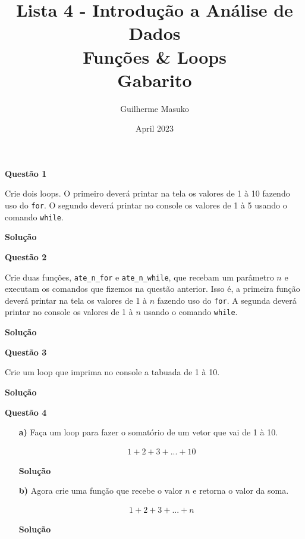 \documentclass[12pt, a4paper]{article}
\title{Lista 4 - Introdução a Análise de Dados \\
	Funções \& Loops\\
	Gabarito}
\author{Guilherme Masuko}
\date{April 2023}
\begin{document}
	
\clearpage
\maketitle
\thispagestyle{empty}

\textbf{Questão 1}

Crie dois loops. O primeiro deverá printar na tela os valores de 1 à 10 fazendo uso do \texttt{for}. O segundo deverá printar no console os valores de 1 à 5 usando o comando \texttt{while}.



\textbf{Solução}





\textbf{Questão 2}

Crie duas funções, \texttt{ate\_n\_for} e \texttt{ate\_n\_while}, que recebam um parâmetro $n$ e executam os comandos que fizemos na questão anterior. Isso é, a primeira função deverá printar na tela os valores de 1 à $n$ fazendo uso do \texttt{for}. A segunda deverá printar no console os valores de 1 à $n$ usando o comando \texttt{while}.



\textbf{Solução}





\textbf{Questão 3}

Crie um loop que imprima no console a tabuada de 1 à 10.



\textbf{Solução}





\textbf{Questão 4}

\begin{itemize}
	\item[\textbf{a)}] Faça um loop para fazer o somatório de um vetor que vai de 1 à 10.
	
		\begin{align*}
			1+ 2+ 3 + ... + 10
		\end{align*}
	
	
	
	\textbf{Solução}
	
	
	
	
	
	\item[\textbf{b)}] Agora crie uma função que recebe o valor $n$ e retorna o valor da soma.
	
		\begin{align*}
			1+ 2+ 3 + ... + n
		\end{align*}
	
	
	\textbf{Solução}
	
	
	
	
		
\end{itemize}
\end{document}
